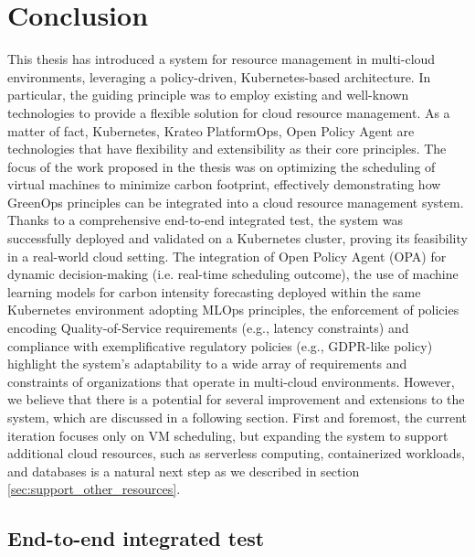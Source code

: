 \chapter{Conclusion}
\label{cha:conclusion}

This thesis has introduced a system for resource management in multi-cloud environments, leveraging a policy-driven, Kubernetes-based architecture. 
In particular, the guiding principle was to employ existing and well-known technologies to provide a flexible solution for cloud resource management.
As a matter of fact, Kubernetes, Krateo PlatformOps, Open Policy Agent are technologies that have flexibility and extensibility as their core principles.
The focus of the work proposed in the thesis was on optimizing the scheduling of virtual machines to minimize carbon footprint, effectively demonstrating how GreenOps principles can be integrated into a cloud resource management system.
Thanks to a comprehensive end-to-end integrated test, the system was successfully deployed and validated on a Kubernetes cluster, proving its feasibility in a real-world cloud setting.
The integration of Open Policy Agent (OPA) for dynamic decision-making (i.e. real-time scheduling outcome), the use of machine learning models for carbon intensity forecasting deployed within the same Kubernetes environment adopting MLOps principles, the enforcement of policies encoding Quality-of-Service requirements (e.g., latency constraints) and compliance with exemplificative regulatory policies (e.g., GDPR-like policy) highlight the system’s adaptability to a wide array of requirements and constraints of organizations that operate in multi-cloud environments.
However, we believe that there is a potential for several improvement and extensions to the system, which are discussed in a following section.
First and foremost, the current iteration focuses only on VM scheduling, but expanding the system to support additional cloud resources, such as serverless computing, containerized workloads, and databases is a natural next step as we described in section \ref{sec:support_other_resources}.


\section{End-to-end integrated test}

